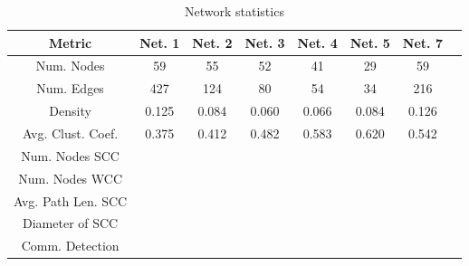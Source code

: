 \begin{table}
    \centering
    \begin{tabular}{|c|c|c|c|c|c|c|c|}
        \hline
        \textbf{Metric} & \textbf{Net. 1} & \textbf{Net. 2} & \textbf{Net. 3} & \textbf{Net. 4} & \textbf{Net. 5} & \textbf{Net. 7} \\
        \hline
        Num. Nodes & 59 & 55 & 52 & 41 & 29 & 59 \\
        \hline
        Num. Edges & 427 & 124 & 80 & 54 & 34 & 216 \\
        \hline
        Density & 0.125 & 0.084 & 0.060 & 0.066 & 0.084 & 0.126 \\
        \hline
        Avg. Clust. Coef. & 0.375 & 0.412 & 0.482 & 0.583 & 0.620 & 0.542 \\
        \hline
        Num. Nodes SCC &  &  &  &  &  &  \\
        \hline
        Num. Nodes WCC &  &  &  &  &  &  \\
        \hline
        Avg. Path Len. SCC &  &  &  &  &  &  \\
        \hline
        Diameter of SCC &  &  &  &  &  &  \\
        \hline
        Comm. Detection &  &  &  &  &  &  \\
        \hline
    \end{tabular}
    \caption{Network statistics}
    \label{table:1}
\end{table}
